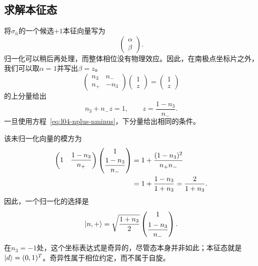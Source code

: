 \subsection{求解本征态}

将\(\sigma_{\hat n}\)的一个候选\(+1\)本征向量写为
\begin{equation}
  \begin{pmatrix}\alpha\\\beta\end{pmatrix}.
\end{equation}
归一化可以稍后再处理，而整体相位没有物理效应。因此，在南极点坐标片之外，我们可以取\(\alpha=1\)并写出\(\beta=z\)。
\begin{equation}
  \begin{pmatrix}
    n_3&n_-\\
    n_+&-n_3
  \end{pmatrix}
  \begin{pmatrix}1\\z\end{pmatrix}
  =
  \begin{pmatrix}1\\z\end{pmatrix}
\end{equation}
的上分量给出
\begin{equation}
  n_3+n_-z=1,
  \qquad
  z=\frac{1-n_3}{n_-}.
  \label{eq:l04-z-solution}
\end{equation}
一旦使用方程~\eqref{eq:l04-nplus-nminus}，下分量给出相同的条件。

该未归一化向量的模方为
\begin{align}
  \begin{pmatrix}
    1&\dfrac{1-n_3}{n_+}
  \end{pmatrix}
  \begin{pmatrix}
    1\\[3pt]\dfrac{1-n_3}{n_-}
  \end{pmatrix}
  &=
  1+\frac{(1-n_3)^2}{n_+n_-}
  \notag\\
  &=
  1+\frac{1-n_3}{1+n_3}
  =
  \frac{2}{1+n_3}.
  \label{eq:l04-unnormalized-norm}
\end{align}
因此，一个归一化的选择是
\begin{equation}
  \left\lvert n,+\right\rangle
  =
  \sqrt{\frac{1+n_3}{2}}
  \begin{pmatrix}
    1\\[5pt]\dfrac{1-n_3}{n_-}
  \end{pmatrix}.
  \label{eq:l04-normalized-n-state}
\end{equation}
在\(n_3=-1\)处，这个坐标表达式是奇异的，尽管态本身并非如此；本征态就是\(\left\lvert d\right\rangle=(0,1)^T\)。奇异性属于相位约定，而不属于自旋。

